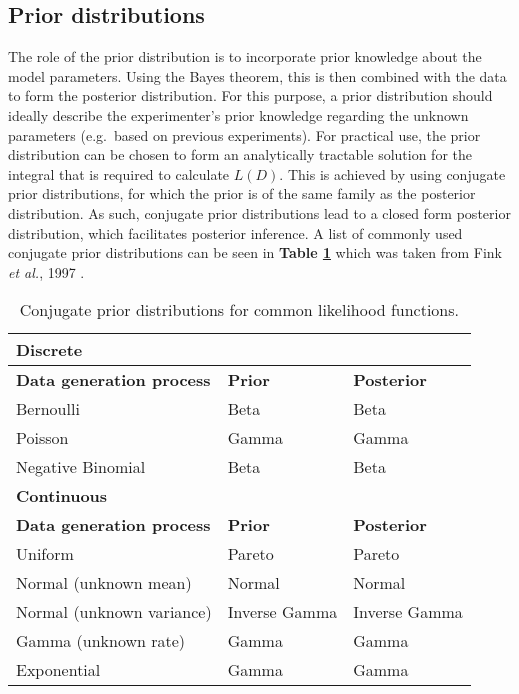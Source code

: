 \newpage

\subsection{Prior distributions}
\label{sec0:prior}

The role of the prior distribution is to incorporate prior knowledge about the model parameters. 
Using the Bayes theorem, this is then combined with the data to form the posterior distribution. 
For this purpose, a prior distribution should ideally describe the experimenter's prior knowledge regarding the unknown parameters (e.g.~based on previous experiments). 
For practical use, the prior distribution can be chosen to form an analytically tractable solution for the integral that is required to calculate $L(D)$. 
This is achieved by using conjugate prior distributions, for which the prior is of the same family as the posterior distribution. 
As such, conjugate prior distributions lead to a closed form posterior distribution, which facilitates posterior inference. 
A list of commonly used conjugate prior distributions can be seen in \textbf{Table \ref{tab0:priors}} which was taken from Fink \emph{et al.}, 1997 \citep{Fink1997}.

\begin{table}[hb	]
\centering
\caption[Conjugate prior distributions for common likelihood functions]{Conjugate prior distributions for common likelihood functions.}
\label{tab0:priors}
\begin{tabular}{l l l}
\toprule
\textbf{Discrete} & &\\
\midrule
\midrule
\textbf{Data generation process} & \textbf{Prior} & \textbf{Posterior} \\ 
\midrule 
Bernoulli & Beta & Beta \\
Poisson & Gamma  & Gamma \\
Negative Binomial & Beta & Beta \\
\midrule
\midrule
\textbf{Continuous} & & \\
\midrule
\midrule
\textbf{Data generation process} & \textbf{Prior} & \textbf{Posterior} \\ 
\midrule
Uniform  & Pareto & Pareto \\ 
Normal (unknown mean) &  Normal  & Normal \\ 
Normal (unknown variance) &  Inverse Gamma  & Inverse Gamma \\ 
Gamma (unknown rate) &  Gamma  & Gamma \\ 
Exponential &  Gamma  & Gamma \\ 
\bottomrule
\end{tabular}
\end{table} 

